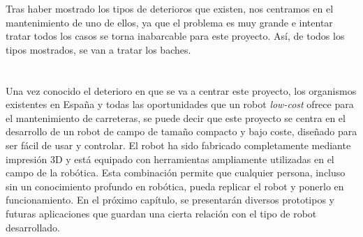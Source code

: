 
Tras haber mostrado los tipos de deterioros que existen, nos centramos en el mantenimiento de uno de ellos, ya que el problema es muy grande e intentar tratar todos los casos se torna inabarcable para este proyecto. Así, de todos los tipos mostrados, se van a tratar los baches.\\\\\\  %

Una vez conocido el deterioro en que se va a centrar este proyecto, los organismos existentes en España y todas las oportunidades que un robot \textit{low-cost} ofrece para el mantenimiento de carreteras, se puede decir que este proyecto se centra en el desarrollo de un robot de campo de tamaño compacto y bajo coste, diseñado para ser fácil de usar y controlar. El robot ha sido fabricado completamente mediante impresión 3D y está equipado con herramientas ampliamente utilizadas en el campo de la robótica. Esta combinación permite que cualquier persona, incluso sin un conocimiento profundo en robótica, pueda replicar el robot y ponerlo en funcionamiento. En el próximo capítulo, se presentarán diversos prototipos y futuras aplicaciones que guardan una cierta relación con el tipo de robot desarrollado.